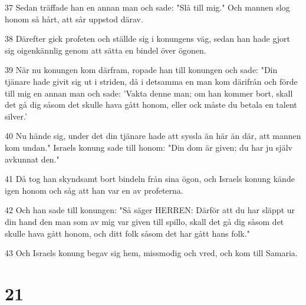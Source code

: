 \par 37 Sedan träffade han en annan man och sade: "Slå till mig." Och mannen slog honom så hårt, att sår uppstod därav.
\par 38 Därefter gick profeten och ställde sig i konungens väg, sedan han hade gjort sig oigenkännlig genom att sätta en bindel över ögonen.
\par 39 När nu konungen kom därfram, ropade han till konungen och sade: "Din tjänare hade givit sig ut i striden, då i detsamma en man kom därifrån och förde till mig en annan man och sade: 'Vakta denne man; om han kommer bort, skall det gå dig såsom det skulle hava gått honom, eller ock måste du betala en talent silver.'
\par 40 Nu hände sig, under det din tjänare hade att syssla än här än där, att mannen kom undan." Israels konung sade till honom: "Din dom är given; du har ju själv avkunnat den."
\par 41 Då tog han skyndsamt bort bindeln från sina ögon, och Israels konung kände igen honom och såg att han var en av profeterna.
\par 42 Och han sade till konungen: "Så säger HERREN: Därför att du har släppt ur din hand den man som av mig var given till spillo, skall det gå dig såsom det skulle hava gått honom, och ditt folk såsom det har gått hans folk."
\par 43 Och Israels konung begav sig hem, missmodig och vred, och kom till Samaria.

\chapter{21}

